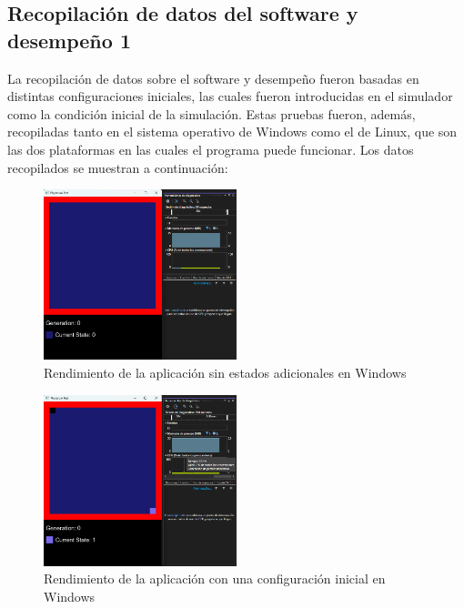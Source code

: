 \subsection{Recopilaci\'on de datos del software y desempe\~no 1}
    La recopilaci\'on de datos sobre el software y desempe\~no
        fueron basadas en distintas configuraciones iniciales, las
        cuales fueron introducidas en el simulador como la
        condici\'on inicial de la simulaci\'on. Estas pruebas fueron,
        adem\'as, recopiladas tanto en el sistema operativo de
        Windows como el de Linux, que son las dos plataformas en
        las cuales el programa puede funcionar. Los datos
        recopilados se muestran a continuaci\'on:
    \vskip 0.5cm
    \begin{figure}[htbp]
        \centering
        \includegraphics[width=0.5\textwidth]{./images/Pruebas/simulador/image019.png}
        \caption{Rendimiento de la aplicaci\'on sin estados adicionales en Windows}
        \label{fig:Ruta 6}
    \end{figure}
    \vskip 0.5cm
    \begin{figure}[htbp]
        \centering
        \includegraphics[width=0.5\textwidth]{./images/Pruebas/simulador/image021.png}
        \caption{Rendimiento de la aplicaci\'on con una configuraci\'on inicial en Windows}
        \label{fig:Ruta 7}
    \end{figure}
